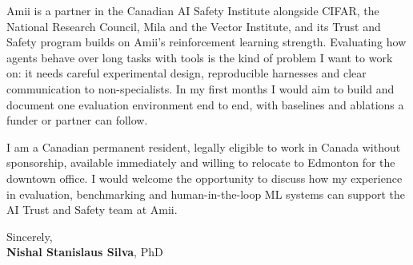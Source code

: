 \documentclass[11pt]{article}
\newcommand{\clName}{Nishal Stanislaus Silva}
\newcommand{\clCompany}{Amii}
\newcommand{\clTeam}{the AI Trust and Safety team}
\begin{document}
Amii is a partner in the Canadian AI Safety Institute alongside CIFAR, the National Research Council, Mila and the Vector Institute, and its Trust and Safety program builds on Amii's reinforcement learning strength. Evaluating how agents behave over long tasks with tools is the kind of problem I want to work on: it needs careful experimental design, reproducible harnesses and clear communication to non-specialists. In my first months I would aim to build and document one evaluation environment end to end, with baselines and ablations a funder or partner can follow.

I am a Canadian permanent resident, legally eligible to work in Canada without sponsorship, available immediately and willing to relocate to Edmonton for the downtown office. I would welcome the opportunity to discuss how my experience in evaluation, benchmarking and human-in-the-loop ML systems can support \clTeam{} at \clCompany{}.

\vspace{8pt}
Sincerely,\\[2pt]
\textbf{\clName}, PhD
\end{document}
